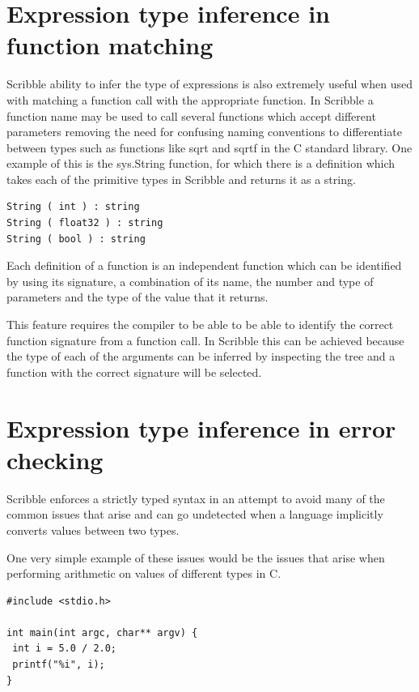 \documentclass[]{final_report}
\begin{document}
\section{Expression type inference in function matching}

Scribble ability to infer the type of expressions is also extremely useful when used with matching a function call with the appropriate function. In Scribble a function name may be used to call several functions which accept different parameters removing the need for confusing naming conventions to differentiate between types such as functions like sqrt and sqrtf in the C standard library. One example of this is the sys.String function, for which there is a definition which takes each of the primitive types in Scribble and returns it as a string.

\begin{verbatim}
String ( int ) : string
String ( float32 ) : string
String ( bool ) : string
\end{verbatim}

Each definition of a function is an independent function which can be identified by using its signature, a combination of its name, the number and type of parameters and the type of the value that it returns.

This feature requires the compiler to be able to be able to identify the correct function signature from a function call. In Scribble this can be achieved because the type of each of the arguments can be inferred by inspecting the tree and a function with the correct signature will be selected.

\section{Expression type inference in error checking}

Scribble enforces a strictly typed syntax in an attempt to avoid many of the common issues that arise and can go undetected when a language implicitly converts values between two types.

One very simple example of these issues would be the issues that arise when performing arithmetic on values of different types in C.

\begin{verbatim}
#include <stdio.h>

int main(int argc, char** argv) {
 int i = 5.0 / 2.0;
 printf("%i", i);
}
\end{verbatim}
\end{document}
